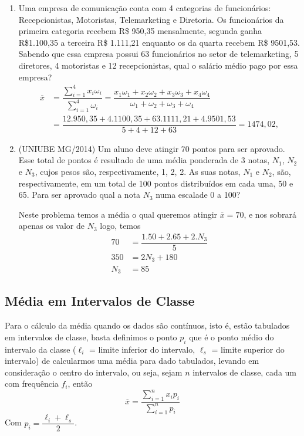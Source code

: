 \noindent \exemplo
\begin{enumerate}
    \item [(i)] Uma empresa de comunicação conta com 4 categorias de funcionários: Recepcionistas, Motoristas, Telemarketing e Diretoria. Os funcionários da primeira categoria recebem R\$ 950,35 mensalmente, segunda ganha R\$1.100,35 a terceira R\$ 1.111,21 enquanto os da quarta recebem R\$ 9501,53. Sabendo que essa empresa possui 63 funcionários no setor de telemarketing, 5 diretores, 4 motoristas e 12 recepcionistas, qual o salário médio pago por essa empresa? 
    \begin{align*}
        \overline{x} &= \dfrac{\displaystyle\sum_{i=1}^{4}x_i\omega_i}{\displaystyle\sum_{i=1}^4\omega_i} = \dfrac{x_1\omega_1 + x_2\omega_2 + x_3\omega_3+ x_4\omega_4}{\omega_1 + \omega_2 + \omega_3 + \omega_4}\\
        &= \dfrac{12.950,35 + 4.1100,35 + 63.1111,21 + 4.9501,53}{5 + 4 + 12 + 63} = 1474,02,
    \end{align*}
    \item[(ii)] (UNIUBE MG/2014) Um aluno deve atingir 70 pontos para ser aprovado. Esse total de pontos é resultado de uma média ponderada de 3 notas, $N_1$, $N_2$ e $N_3$, cujos pesos são, respectivamente, 1, 2, 2. As suas notas, $N_1$ e $N_2$, são, respectivamente, em um total de 100 pontos distribuídos em cada uma, 50 e 65. Para ser aprovado qual a nota $N_3$ numa escalade 0 a 100? 
    
    Neste problema temos a média o qual queremos atingir $\overline{x}=70$, e nos sobrará apenas os valor de $N_3$ logo, temos
    \begin{align*}
        70 &= \dfrac{1.50+2.65+2.N_3}{5}\\
        350 &= 2N_3 + 180 \\
        N_3&=85
    \end{align*}
\end{enumerate}

\subsection{Média em Intervalos de Classe}
\inic Para o cálculo da média quando os dados são contínuos, isto é, estão tabulados em intervalos de classe, basta definimos o ponto $p_i$ que é o ponto médio do intervalo da classe ($\ell_i$ = limite inferior do intervalo, $\ell_s$ = limite superior do intervalo) de calcularmos uma média para dado tabulados, levando em consideração o centro do intervalo, ou seja, sejam $n$ intervalos de classe, cada um com frequência $f_i$, então
\begin{equation}
    \overline{x} = \dfrac{\sum^{n}_{i=1}x_ip_i}{\sum^{n}_{i=1}p_i}
\end{equation}
Com $p_i = \dfrac{\ell_i + \ell_s}{2}$. 
